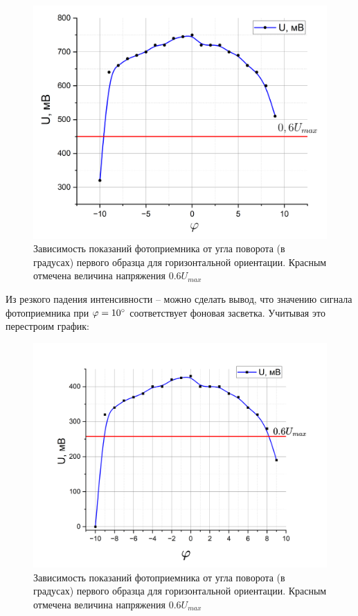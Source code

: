 \documentclass[a4paper,12pt]{article}
\begin{document}
\begin{figure}[h!]
	\centering
	\includegraphics[width=0.8\linewidth]{Horizontal}
	\caption{Зависимость показаний фотоприемника от угла поворота (в градусах) первого образца для горизонтальной ориентации. Красным отмечена величина напряжения $0.6 U_{max}$}
\end{figure}

\newpage

Из резкого падения интенсивности -- можно сделать вывод, что значению сигнала фотоприемника при $\varphi = 10 \degree$ соответствует фоновая засветка. Учитывая это перестроим график:

\begin{figure}[h!]
	\centering
	\includegraphics[width=0.95\linewidth]{Horizontal_2}
	\caption{Зависимость показаний фотоприемника от угла поворота (в градусах) первого образца для горизонтальной ориентации. Красным отмечена величина напряжения $0.6 U_{max}$}
\end{figure}
\end{document}
